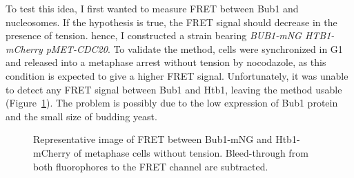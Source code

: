 To test this idea, I first wanted to measure FRET between Bub1 and nucleosomes. If the hypothesis is true, the FRET signal should decrease in the presence of tension. hence, I constructed a strain bearing \textit{BUB1-mNG HTB1-mCherry pMET-CDC20}. To validate the method, cells were synchronized in G1 and released into a metaphase arrest without tension by nocodazole, as this condition is expected to give a higher FRET signal. Unfortunately, it was unable to detect any FRET signal between Bub1 and Htb1, leaving the method usable (Figure~\ref{fig:FRET}). The problem is possibly due to the low expression of Bub1 protein and the small size of budding yeast. 

\begin{figure}[htbp]
  \centering
  
  \caption[Representative image of FRET between Bub1-mNG and Htb1-mCherry of metaphase cells without tension]{Representative image of FRET between Bub1-mNG and Htb1-mCherry of metaphase cells without tension. Bleed-through from both fluorophores to the FRET channel are subtracted. }
  \label{fig:FRET}
\end{figure} 

